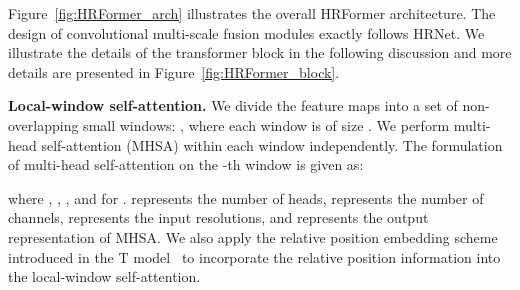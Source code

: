 \documentclass{article}
\begin{document}
Figure~\ref{fig:HRFormer_arch} illustrates the overall HRFormer architecture.
The design of convolutional multi-scale fusion modules exactly follows HRNet.
We illustrate the details of the transformer block in the following discussion
and more details are presented in Figure~\ref{fig:HRFormer_block}.


\vspace{.1cm}
\noindent\textbf{Local-window self-attention.}
We divide the feature maps  into
a set of non-overlapping small windows:
,
where each window is of size .
We perform multi-head self-attention (MHSA) within each window independently.
The formulation of multi-head self-attention on the -th window is given as:

\noindent where ,
,
,
and 
for .
 represents the number of heads,
 represents the number of channels,
 represents the input resolutions, and
 represents the output representation of MHSA.
We also apply the relative position embedding scheme
introduced in the T model~\cite{2020t5} to incorporate the relative position
information into the local-window self-attention.
\end{document}
